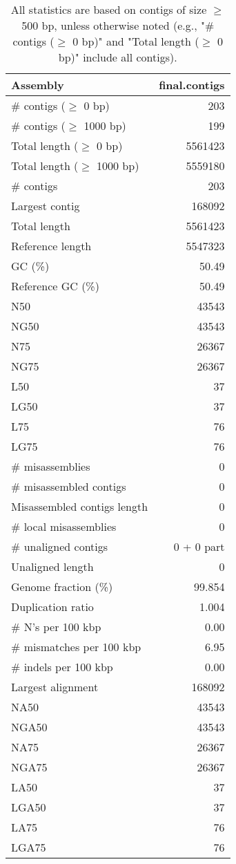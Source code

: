 \documentclass[12pt,a4paper]{article}
\begin{document}
\begin{table}[ht]
\begin{center}
\caption{All statistics are based on contigs of size $\geq$ 500 bp, unless otherwise noted (e.g., "\# contigs ($\geq$ 0 bp)" and "Total length ($\geq$ 0 bp)" include all contigs).}
\begin{tabular}{|l*{1}{|r}|}
\hline
Assembly & final.contigs \\ \hline
\# contigs ($\geq$ 0 bp) & 203 \\ \hline
\# contigs ($\geq$ 1000 bp) & 199 \\ \hline
Total length ($\geq$ 0 bp) & 5561423 \\ \hline
Total length ($\geq$ 1000 bp) & 5559180 \\ \hline
\# contigs & 203 \\ \hline
Largest contig & 168092 \\ \hline
Total length & 5561423 \\ \hline
Reference length & 5547323 \\ \hline
GC (\%) & 50.49 \\ \hline
Reference GC (\%) & 50.49 \\ \hline
N50 & 43543 \\ \hline
NG50 & 43543 \\ \hline
N75 & 26367 \\ \hline
NG75 & 26367 \\ \hline
L50 & 37 \\ \hline
LG50 & 37 \\ \hline
L75 & 76 \\ \hline
LG75 & 76 \\ \hline
\# misassemblies & 0 \\ \hline
\# misassembled contigs & 0 \\ \hline
Misassembled contigs length & 0 \\ \hline
\# local misassemblies & 0 \\ \hline
\# unaligned contigs & 0 + 0 part \\ \hline
Unaligned length & 0 \\ \hline
Genome fraction (\%) & 99.854 \\ \hline
Duplication ratio & 1.004 \\ \hline
\# N's per 100 kbp & 0.00 \\ \hline
\# mismatches per 100 kbp & 6.95 \\ \hline
\# indels per 100 kbp & 0.00 \\ \hline
Largest alignment & 168092 \\ \hline
NA50 & 43543 \\ \hline
NGA50 & 43543 \\ \hline
NA75 & 26367 \\ \hline
NGA75 & 26367 \\ \hline
LA50 & 37 \\ \hline
LGA50 & 37 \\ \hline
LA75 & 76 \\ \hline
LGA75 & 76 \\ \hline
\end{tabular}
\end{center}
\end{table}
\end{document}
